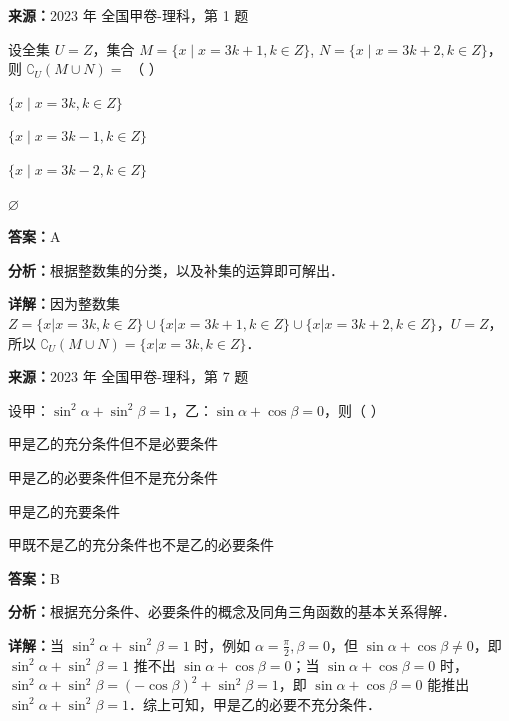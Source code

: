 \begin{question}[points=5]
\textbf{来源：}2023 年 全国甲卷-理科，第 1 题\par
设全集 $U = Z$，集合 $M = \{ x \mid x = 3k + 1, k \in Z \}$, $N = \{ x \mid x = 3k + 2, k \in Z \}$，则 $\complement_U (M \cup N) = $ （   ）
\begin{choices}
  \item $\{ x \mid x = 3k, k \in Z \}$
  \item $\{ x \mid x = 3k - 1, k \in Z \}$
  \item $\{ x \mid x = 3k - 2, k \in Z \}$
  \item $\varnothing$
\end{choices}
\begin{solution}
\textbf{答案：}A

\textbf{分析：}根据整数集的分类，以及补集的运算即可解出．

\textbf{详解：}因为整数集 $Z = \{ x | x = 3k, k \in Z \} \cup \{ x | x = 3k + 1, k \in Z \} \cup \{ x | x = 3k + 2, k \in Z \}$，$U = Z$，所以 $\complement_U (M \cup N) = \{ x | x = 3k, k \in Z \}$．
\end{solution}
\end{question}

\begin{question}[points=5]
\textbf{来源：}2023 年 全国甲卷-理科，第 7 题\par
设甲：$\sin^2 \alpha + \sin^2 \beta = 1$，乙：$\sin \alpha + \cos \beta = 0$，则（           ）
\begin{choices}
  \item 甲是乙的充分条件但不是必要条件
  \item 甲是乙的必要条件但不是充分条件
  \item 甲是乙的充要条件
  \item 甲既不是乙的充分条件也不是乙的必要条件
\end{choices}
\begin{solution}
\textbf{答案：}B

\textbf{分析：}根据充分条件、必要条件的概念及同角三角函数的基本关系得解．

\textbf{详解：}当 $\sin^2 \alpha + \sin^2 \beta = 1$ 时，例如 $\alpha = \frac{\pi}{2}, \beta = 0$，但 $\sin \alpha + \cos \beta \neq 0$，即 $\sin^2 \alpha + \sin^2 \beta = 1$ 推不出 $\sin \alpha + \cos \beta = 0$；当 $\sin \alpha + \cos \beta = 0$ 时，$\sin^2 \alpha + \sin^2 \beta = (-\cos \beta)^2 + \sin^2 \beta = 1$，即 $\sin \alpha + \cos \beta = 0$ 能推出 $\sin^2 \alpha + \sin^2 \beta = 1$．综上可知，甲是乙的必要不充分条件．
\end{solution}
\end{question}

